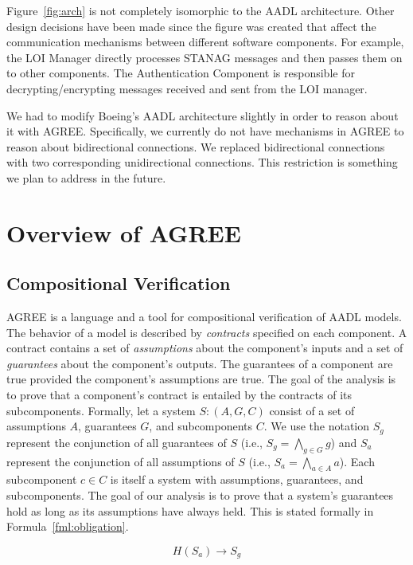 \documentclass{llncs}
\begin{document}
Figure~\ref{fig:arch} is not completely isomorphic to the AADL architecture.  Other design decisions have been made since the figure was created that affect the communication mechanisms between different software components.  For example, the LOI Manager directly processes STANAG messages and then passes them on to other components.  The Authentication Component is responsible for decrypting/encrypting messages received and sent from the LOI manager.

We had to modify Boeing's AADL architecture slightly in order to reason about it with AGREE. Specifically, we currently do not have mechanisms in AGREE to reason about bidirectional connections.  We replaced bidirectional connections with two corresponding unidirectional connections.  This restriction is something we plan to address in the future.

\section{Overview of AGREE}

\subsection{Compositional Verification}\label{sec:comp-v}
AGREE is a language and a tool for compositional verification of AADL models.  The behavior of a model is described by \textit{contracts} specified on each component.  A contract contains a set of \textit{assumptions} about the component's inputs and a set of \textit{guarantees} about the component's outputs.  The guarantees of a component are true provided the component's assumptions are true.  The goal of the analysis is to prove that a component's contract is entailed by the contracts of its subcomponents.  Formally, let a system $S : (A,G,C)$ consist of a set of assumptions $A$, guarantees $G$, and subcomponents $C$. We use the notation $S_g$ represent the conjunction of all guarantees of $S$ (i.e., $S_g = \bigwedge_{g \in G} g$) and $S_a$ represent the conjunction of all assumptions of $S$ (i.e., $S_a = \bigwedge_{a \in A} a$). Each subcomponent $c \in C$ is itself a system with assumptions, guarantees, and subcomponents. The goal of our analysis is to prove that a system's guarantees hold as long as its assumptions have always held.  This is stated formally in Formula~\ref{fml:obligation}.

\begin{center}
\begin{equation}\label{fml:obligation}
H(S_a) \rightarrow S_g
\end{equation}
\end{center}
\end{document}
